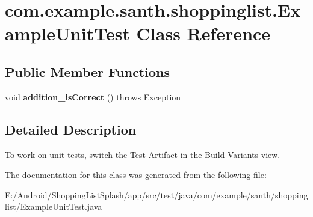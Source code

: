 \hypertarget{classcom_1_1example_1_1santh_1_1shoppinglist_1_1_example_unit_test}{}\section{com.\+example.\+santh.\+shoppinglist.\+Example\+Unit\+Test Class Reference}
\label{classcom_1_1example_1_1santh_1_1shoppinglist_1_1_example_unit_test}
\subsection*{Public Member Functions}
\begin{DoxyCompactItemize}
\item 
void {\bfseries addition\+\_\+is\+Correct} ()  throws Exception \hypertarget{classcom_1_1example_1_1santh_1_1shoppinglist_1_1_example_unit_test_a3b688cc3a3df39e283af5fd2c9a02df1}{}\label{classcom_1_1example_1_1santh_1_1shoppinglist_1_1_example_unit_test_a3b688cc3a3df39e283af5fd2c9a02df1}

\end{DoxyCompactItemize}


\subsection{Detailed Description}
To work on unit tests, switch the Test Artifact in the Build Variants view. 

The documentation for this class was generated from the following file\+:\begin{DoxyCompactItemize}
\item 
E\+:/\+Android/\+Shopping\+List\+Splash/app/src/test/java/com/example/santh/shoppinglist/Example\+Unit\+Test.\+java\end{DoxyCompactItemize}
